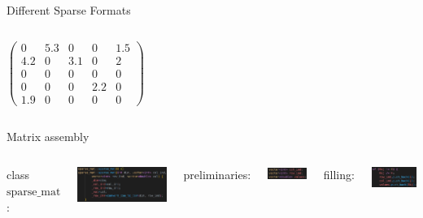 \documentclass[aspectratio=169,xcolor=dvipsnames]{beamer}
\begin{document}
\begin{frame}{Different Sparse Formats}
\begin{columns}[c]
        $ \left( \begin{array}{rrrrr} 
0 & 5.3 & 0 & 0 & 1.5\\ 
4.2 & 0& 3.1 & 0 & 2\\ 
0 & 0 & 0 & 0 & 0 \\
0 & 0 & 0 & 2.2 & 0 \\
1.9 & 0 & 0 & 0 & 0
\end{array} \right) $

    \end{columns}
\end{frame}

\begin{frame}{Matrix assembly}

\begin{columns}[c]


class $\mathrm{sparse\_mat}$:

\begin{center}
    \includegraphics[width=0.9\linewidth]{class_sparsematrix.png}
    \end{center}


        
       preliminaries: \\
\begin{center}
    \includegraphics[width=0.4\linewidth]{sparse_construct.png}
    \end{center}

filling:
 
\begin{center}
    \includegraphics[width=0.5\linewidth]{sparse_fill.png}
    \end{center}


\end{columns}
\end{frame}
\end{document}
